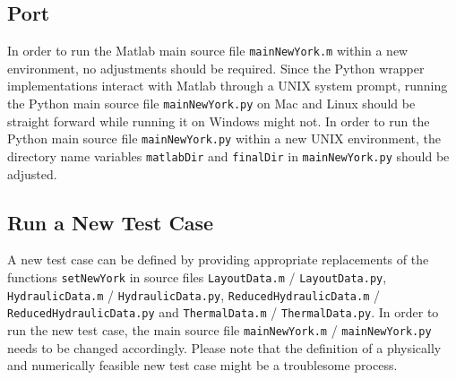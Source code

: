 \documentclass[a4paper,10pt]{article}
\begin{document}
\subsection{Port}

In order to run the Matlab main source file \texttt{mainNewYork.m} within a new environment, no adjustments should be required.
Since the Python wrapper implementations interact with Matlab through a UNIX system prompt, running the Python main source file \texttt{mainNewYork.py} on Mac and Linux should be straight forward while running it on Windows might not. 
In order to run the Python main source file \texttt{mainNewYork.py} within a new UNIX environment, the directory name variables \texttt{matlabDir} and \texttt{finalDir} in \texttt{mainNewYork.py} should be adjusted.

\subsection{Run a New Test Case}

A new test case can be defined by providing appropriate replacements of the functions \texttt{setNewYork} in source files \texttt{LayoutData.m} / \texttt{LayoutData.py}, \texttt{HydraulicData.m} / \texttt{HydraulicData.py}, \texttt{ReducedHydraulicData.m} / \texttt{ReducedHydraulicData.py} and \texttt{ThermalData.m} / \texttt{ThermalData.py}.
In order to run the new test case, the main source file \texttt{mainNewYork.m} / \texttt{mainNewYork.py} needs to be changed accordingly.
Please note that the definition of a physically and numerically feasible new test case might be a troublesome process.



\end{document}
